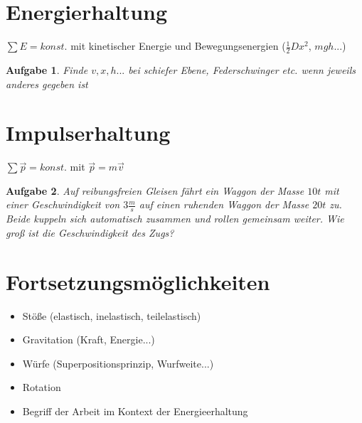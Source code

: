 \documentclass[a4paper,12pt]{extarticle}
\theoremstyle{problemstyle}
\newtheorem{problem}{Aufgabe}
\begin{document}
\begin{multicols}{2}
\section*{Energierhaltung}
$\sum E = konst.$ mit kinetischer Energie und Bewegungsenergien ($\frac{1}{2}Dx^2$, $mgh$...)\\
\begin{problem}Finde $v,x,h...$ bei schiefer Ebene, Federschwinger etc. wenn jeweils anderes gegeben ist
\end{problem}
\section*{Impulserhaltung}
$\sum \vec{p} = konst.$ mit $\vec{p}=m\vec{v}$
\begin{problem}
Auf reibungsfreien Gleisen fährt ein Waggon der Masse $10t$ mit einer Geschwindigkeit von $3\frac{m}{s}$ auf einen ruhenden Waggon der Masse $20t$ zu. Beide kuppeln sich automatisch zusammen und rollen gemeinsam weiter. Wie groß ist die Geschwindigkeit des Zugs?
\end{problem}
\section*{Fortsetzungsmöglichkeiten}
\begin{itemize}
\item Stöße (elastisch, inelastisch, teilelastisch)
\item Gravitation (Kraft, Energie...)
\item Würfe (Superpositionsprinzip, Wurfweite...)
\item Rotation
\item Begriff der Arbeit im Kontext der Energieerhaltung

\end{itemize}
\end{multicols}
\end{document}
